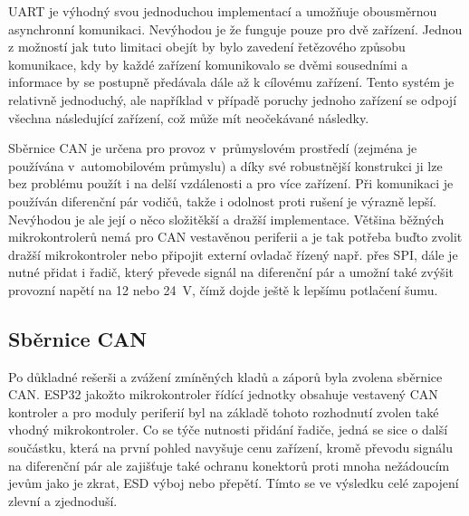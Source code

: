         UART je výhodný svou jednoduchou implementací a umožňuje obousměrnou asynchronní komunikaci. Nevýhodou je že funguje pouze pro dvě zařízení. Jednou z možností jak tuto limitaci obejít by bylo zavedení řetězového způsobu komunikace, kdy by každé zařízení komunikovalo se dvěmi sousedními a informace by se postupně předávala dále až k cílovému zařízení. Tento systém je relativně jednoduchý, ale například v případě poruchy jednoho zařízení se odpojí všechna následující zařízení, což může mít neočekávané následky.

        Sběrnice CAN je určena pro provoz v~průmyslovém prostředí (zejména je používána v~automobilovém průmyslu) a díky své robustnější konstrukci ji lze bez problému použít i na delší vzdálenosti a pro více zařízení. Při komunikaci je používán diferenční pár vodičů, takže i odolnost proti rušení je výrazně lepší. Nevýhodou je ale její o něco složitěkší a dražší implementace. Většina běžných mikrokontrolerů nemá pro CAN vestavěnou periferii a je tak potřeba buďto zvolit dražší mikrokontroler nebo připojit externí ovladač řízený např. přes SPI, dále je nutné přidat i řadič, který převede signál na diferenční pár a umožní také zvýšit provozní napětí na 12  nebo \qty{24}{V}, čímž dojde ještě k lepšímu potlačení šumu.

    \subsection{Sběrnice CAN}
        Po důkladné rešerši a zvážení zmíněných kladů a záporů byla  zvolena sběrnice CAN. ESP32 jakožto mikrokontroler řídící jednotky obsahuje vestavený CAN kontroler a pro moduly periferií byl na základě tohoto rozhodnutí zvolen také vhodný mikrokontroler. Co se týče nutnosti přidání řadiče, jedná se sice o další součástku, která na první pohled navyšuje cenu zařízení, kromě převodu signálu na diferenční pár ale zajišťuje také ochranu konektorů proti mnoha nežádoucím jevům jako je zkrat, ESD výboj nebo přepětí. Tímto se ve výsledku celé zapojení zlevní a zjednoduší.


   

